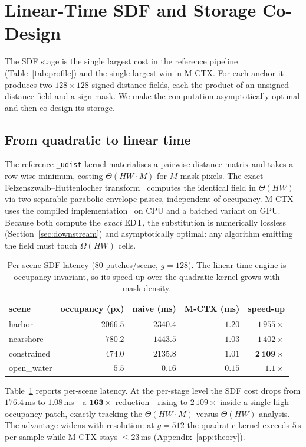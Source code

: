 \section{Linear-Time SDF and Storage Co-Design}\label{sec:sdf}

The SDF stage is the single largest cost in the reference pipeline
(Table~\ref{tab:profile}) and the single largest win in M-CTX. For each
anchor it produces two $128\!\times\!128$ signed distance fields, each the
product of an unsigned distance field and a sign mask. We make the
computation asymptotically optimal and then co-design its storage.

\subsection{From quadratic to linear time}
The reference \texttt{\_udist} kernel materialises a pairwise distance
matrix and takes a row-wise minimum, costing $\Theta(HW\!\cdot\!M)$ for
$M$ mask pixels. The exact Felzenszwalb--Huttenlocher
transform~\cite{felzenszwalb2004distance} computes the identical field in
$\Theta(HW)$ via two separable parabolic-envelope passes, independent of
occupancy. M-CTX uses the compiled implementation~\cite{virtanen2020scipy}
on CPU and a batched variant on GPU. Because both compute the
\emph{exact} EDT, the substitution is numerically lossless
(Section~\ref{sec:downstream}) and asymptotically optimal: any algorithm
emitting the field must touch $\Omega(HW)$ cells.

\begin{table}[t]
\centering
\caption{Per-scene SDF latency ($80$ patches/scene, $g{=}128$). The
linear-time engine is occupancy-invariant, so its speed-up over the
quadratic kernel grows with mask density.}\label{tab:sdf-scene}
\small
\begin{tabular}{lrrrr}
\toprule
scene & occupancy (px) & naive (ms) & M-CTX (ms) & speed-up\\
\midrule
harbor       & $2066.5$ & $2340.4$ & $1.20$ & $1\,955\times$ \\
nearshore    & $780.2$  & $1443.5$ & $1.03$ & $1\,402\times$ \\
constrained  & $474.0$  & $2135.8$ & $1.01$ & $\mathbf{2\,109\times}$ \\
open\_water  & $5.5$    & $0.16$   & $0.15$ & $1.1\times$ \\
\bottomrule
\end{tabular}
\end{table}

Table~\ref{tab:sdf-scene} reports per-scene latency. At the per-stage
level the SDF cost drops from $176.4$\,ms to $1.08$\,ms---a
$\mathbf{163\times}$ reduction---rising to $2\,109\times$ inside a single
high-occupancy patch, exactly tracking the $\Theta(HW\!\cdot\!M)$ versus
$\Theta(HW)$ analysis. The advantage widens with resolution: at
$g\!=\!512$ the quadratic kernel exceeds $5$\,s per sample while M-CTX
stays $\le\!23$\,ms (Appendix~\ref{app:theory}).


